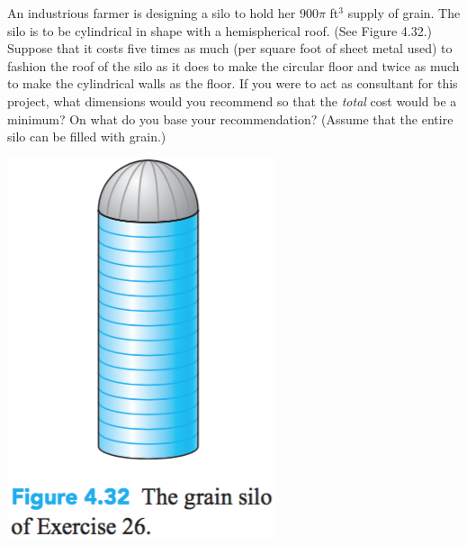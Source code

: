 \documentclass[12pt,letterpaper]{hmcpset}
\begin{document}
\begin{problem}[Colley 4.3.26]
    An industrious farmer is designing a silo to hold her $900\pi$
    ft$^3$ supply of grain. The silo is to be cylindrical in shape with
    a hemispherical roof. (See Figure 4.32.) Suppose that it costs
    five times as much (per square foot of sheet metal used) to
    fashion the roof of the silo as it does to make the circular floor
    and twice as much to make the cylindrical walls as the floor. If
    you were to act as consultant for this project, what dimensions
    would you recommend so that the \textit{total} cost would be a
    minimum? On what do you base your recommendation? (Assume that the
    entire silo can be filled with grain.)
    \begin{center}
        \includegraphics[scale=0.8]{img/4_3_26}
    \end{center}
\end{problem}
\begin{solution}
    \vfill
\end{solution}
\end{document}

